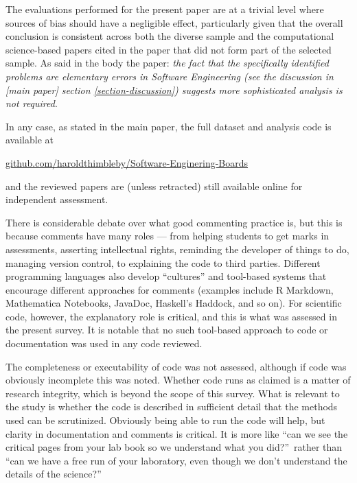 \documentclass[10pt,a4paper]{article}
\begin{document}
The evaluations performed for the present paper are at a trivial level where sources of bias should have a negligible effect, particularly given that the overall conclusion is consistent across both the diverse sample and the computational science-based papers cited in the paper that did not form part of the selected sample. As said in the body the paper: \emph{the fact that the specifically identified problems are elementary errors in Software Engineering (see the discussion in \emph{[main paper]\/} section \ref{section-discussion}) suggests more sophisticated analysis is not required}. 

In any case, as stated in the main paper, the full dataset and analysis code is available at \begin{center}\url{github.com/haroldthimbleby/Software-Enginering-Boards}\end{center} and the reviewed papers are (unless retracted) still available online for independent assessment. %

There is considerable debate over what good commenting practice is, but this is because comments have many roles --- from helping students to get marks in assessments, asserting intellectual rights, reminding the developer of things to do, managing version control, to explaining the code to third parties. Different programming languages also develop ``cultures'' and tool-based systems that encourage different approaches for comments (examples include R Markdown, Mathematica Notebooks, JavaDoc, Haskell's Haddock, and so on). For scientific code, however, the explanatory role is critical, and this is what was assessed in the present survey. It is notable that no such tool-based approach to code or documentation was used in any code reviewed.

The completeness or executability of code was not assessed, although if code was obviously incomplete this was noted. Whether code runs as claimed is a matter of research integrity, which is beyond the scope of this survey. What is relevant to the study is whether the code is described in sufficient detail that the methods used can be scrutinized. Obviously being able to run the code will help, but clarity in documentation and comments is critical. It is more like ``can we see the critical pages from your lab book so we understand what you did?''\ rather than ``can we have a free run of your laboratory, even though we don't understand the details of the science?''
\end{document}
